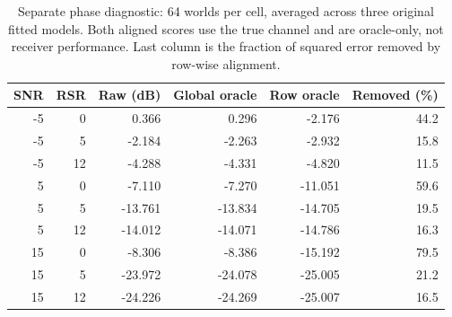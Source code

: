 \begin{table}[!t]
\caption{Separate phase diagnostic: 64 worlds per cell, averaged across three original fitted models. Both aligned scores use the true channel and are oracle-only, not receiver performance. Last column is the fraction of squared error removed by row-wise alignment.}
\label{tab:training-phase}\centering\footnotesize
\setlength{\tabcolsep}{3pt}
\begin{tabular}{@{}rrrrrr@{}}\toprule
SNR & RSR & Raw (dB) & Global oracle & Row oracle & Removed (\%)\\
\midrule
-5 & 0 & 0.366 & 0.296 & -2.176 & 44.2\\
-5 & 5 & -2.184 & -2.263 & -2.932 & 15.8\\
-5 & 12 & -4.288 & -4.331 & -4.820 & 11.5\\
5 & 0 & -7.110 & -7.270 & -11.051 & 59.6\\
5 & 5 & -13.761 & -13.834 & -14.705 & 19.5\\
5 & 12 & -14.012 & -14.071 & -14.786 & 16.3\\
15 & 0 & -8.306 & -8.386 & -15.192 & 79.5\\
15 & 5 & -23.972 & -24.078 & -25.005 & 21.2\\
15 & 12 & -24.226 & -24.269 & -25.007 & 16.5\\
\bottomrule
\end{tabular}
\end{table}
